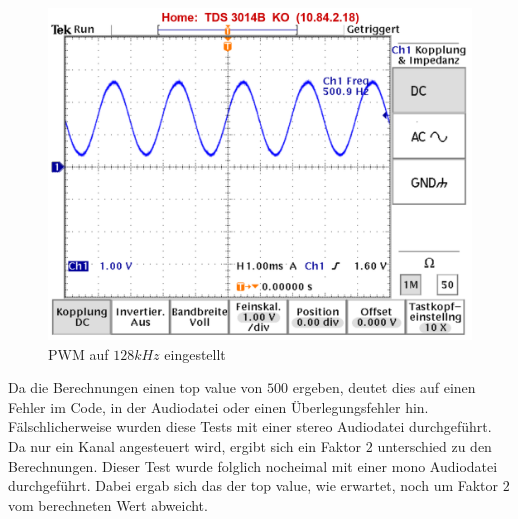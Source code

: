 \begin{figure}[ht!]
\center
\includegraphics[scale=1.0]{data/TOPVAL_Stereo_125.png}
\caption{PWM auf $128kHz$ eingestellt}
\label{fig:PWM Topval 125 Stereo}
\end{figure}

Da die Berechnungen einen top value von $500$ ergeben, deutet dies auf einen Fehler im Code, in der Audiodatei oder einen Überlegungsfehler hin. Fälschlicherweise wurden diese Tests mit einer stereo Audiodatei durchgeführt. Da nur ein Kanal angesteuert wird, ergibt sich ein Faktor $2$ unterschied zu den Berechnungen. Dieser Test wurde folglich nocheimal mit einer mono Audiodatei durchgeführt. Dabei ergab sich das der top value, wie erwartet, noch um Faktor $2$ vom berechneten Wert abweicht. 


